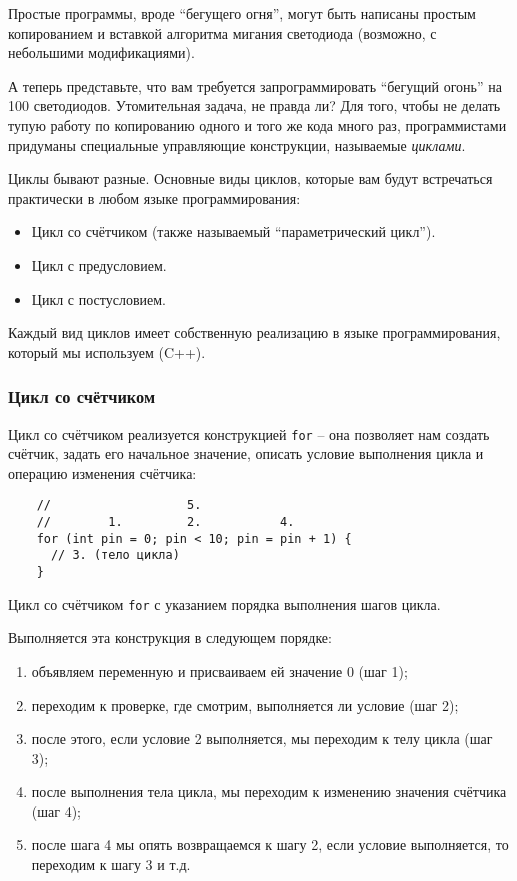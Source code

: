 \documentclass[../sparc.tex]{subfiles}
\begin{document}
Простые программы, вроде ``бегущего огня'', могут быть написаны простым
копированием и вставкой алгоритма мигания светодиода (возможно, с небольшими
модификациями).

А теперь представьте, что вам требуется запрограммировать ``бегущий огонь'' на
100 светодиодов. Утомительная задача, не правда ли? Для того, чтобы не делать
тупую работу по копированию одного и того же кода много раз, программистами
придуманы специальные управляющие конструкции, называемые \emph{циклами}.

Циклы бывают разные. Основные виды циклов, которые вам будут встречаться
практически в любом языке программирования:
\begin{itemize}
\item Цикл со счётчиком (также называемый ``параметрический цикл'').
\item Цикл с предусловием.
\item Цикл с постусловием.
\end{itemize}

Каждый вид циклов имеет собственную реализацию в языке программирования, который
мы используем (C++).

\subsubsection{Цикл со счётчиком}

Цикл со счётчиком реализуется конструкцией \texttt{for} -- она позволяет нам
создать счётчик, задать его начальное значение, описать условие выполнения цикла
и операцию изменения счётчика:

\begin{listing}[ht]
  \begin{verbatim}
    //                   5.
    //        1.         2.           4.
    for (int pin = 0; pin < 10; pin = pin + 1) {
      // 3. (тело цикла)
    }
  \end{verbatim}
  \label{listing:dialogues-with-computer-for}
  \caption{Цикл со счётчиком \texttt{for} с указанием порядка выполнения шагов
    цикла.}
\end{listing}

Выполняется эта конструкция в следующем порядке:
\begin{enumerate}
\item объявляем переменную и присваиваем ей значение 0 (шаг 1);
\item переходим к проверке, где смотрим, выполняется ли условие (шаг 2);
\item после этого, если условие 2 выполняется, мы переходим к телу цикла (шаг 3);
\item после выполнения тела цикла, мы переходим к изменению значения счётчика (шаг 4);
\item после шага 4 мы опять возвращаемся к шагу 2, если условие выполняется, то
  переходим к шагу 3 и т.д.
\end{enumerate}
\end{document}
